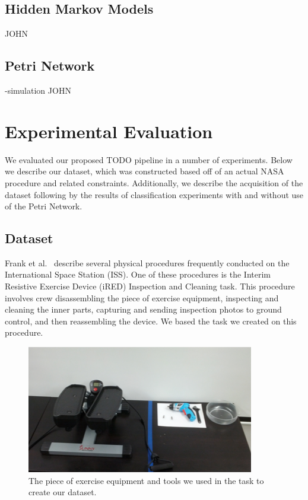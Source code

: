 \documentclass[10pt,twocolumn,letterpaper]{article}
\begin{document}
\subsection{Hidden Markov Models}
JOHN

\subsection{Petri Network}
-simulation
JOHN
\section{Experimental Evaluation}

We evaluated our proposed TODO pipeline in a number of experiments. Below we describe our dataset, which was constructed based off of an actual NASA procedure and related constraints. Additionally, we describe the acquisition of the dataset following by the results of classification experiments with and without use of the Petri Network.

\subsection{Dataset}

Frank et al.~\cite{frank2013autonomous} describe several physical procedures frequently conducted on the International Space Station (ISS). One of these procedures is the Interim Resistive Exercise Device (iRED) Inspection and Cleaning task. This procedure involves crew disassembling the piece of exercise equipment, inspecting and cleaning the inner parts, capturing and sending inspection photos to ground control, and then reassembling the device. We based the task we created on this procedure.

\begin{figure}[!t]
    \centering
    \includegraphics[width=\columnwidth]{fig/equipment.png}
    \caption{The piece of exercise equipment and tools we used in the task to create our dataset.}
    \label{fig:equipment}
\end{figure}
\end{document}
